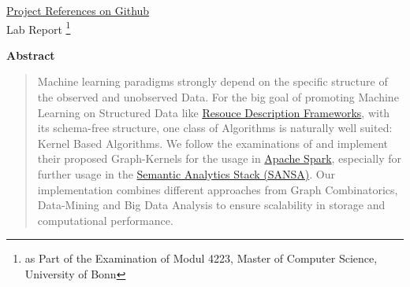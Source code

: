 
\maketitle
\begin{center}\large
\href{https://github.com/DennisKubitza/Lab-DBDA-RDF-Kernels-for-Spark}{Project References on Github} \\
Lab Report \footnote{as Part of the Examination of Modul 4223, Master of Computer Science, University of Bonn} 
\end{center}

\vspace{0.5cm}
\renewcommand{\baselinestretch}{1.3}\normalsize

\setcounter{page}{1}
\thispagestyle{empty}

\begin{center}\textbf{Abstract}\end{center}
\begin{abstract}
\noindent Machine learning paradigms strongly depend on the specific structure of the observed and unobserved Data. For the big goal of promoting Machine Learning on Structured Data like \href{https://w3.org/RDF}{Resouce Description Frameworks}, with its schema-free structure, one class of Algorithms is naturally well suited: Kernel Based Algorithms. We follow the examinations of \citet{mainsource} and implement their proposed Graph-Kernels for the usage in \href{https://spark.apache.org/research.html}{Apache Spark}, especially for further usage in the \href{http://sansa-stack.net/}{Semantic Analytics Stack (SANSA)}. Our implementation combines different approaches from Graph Combinatorics, Data-Mining and Big Data Analysis to ensure scalability in storage and computational performance.  \newline
\end{abstract}


\newpage
\tableofcontents
\newpage
